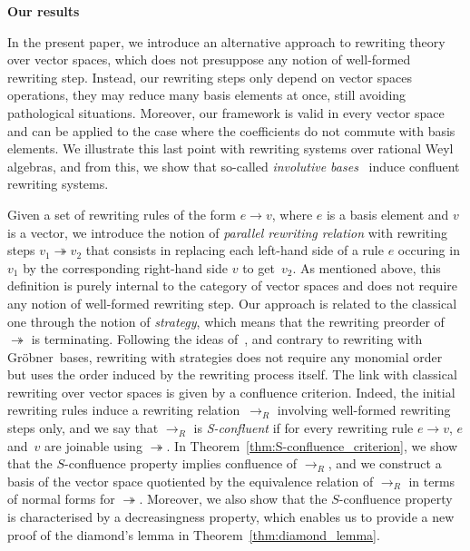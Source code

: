 \documentclass[11pt]{article}
\theoremstyle{definition}
\newcommand\G{Gröbner}
\newcommand\rewR{\to_R}
\newcommand\parRew{\twoheadrightarrow}
\begin{document}
\begin{center}
  \large\bf Our results
\end{center}

In the present paper, we introduce an alternative approach to rewriting
theory over vector spaces, which does not presuppose any notion of
well-formed rewriting step. Instead, our rewriting steps only depend on
vector spaces operations, they may reduce many basis elements at once,
still avoiding pathological situations. Moreover, our framework is valid
in every vector space and can be applied to the case where the
coefficients do not commute with basis elements. We illustrate this last
point with rewriting systems over rational Weyl algebras, and from this,
we show that so-called {\em involutive bases}~\cite{MR1627129} induce
confluent rewriting systems.
\medskip

Given a set of rewriting rules of the form $e\to v$, where $e$ is a basis
element and $v$ is a vector, we introduce the notion of
{\em parallel rewriting relation} with rewriting steps $v_1\parRew v_2$
that consists in replacing each left-hand side of a rule $e$ occuring in
$v_1$ by the corresponding right-hand side $v$ to get~$v_2$. As mentioned
above, this definition is purely internal to the category of vector
spaces and does not require any notion of well-formed rewriting step. Our
approach is related to the classical one through the notion of
{\em strategy}, which means that the rewriting preorder of $\parRew$ is
terminating. Following the ideas of~\cite{GuiraudHoffbeckMalbos19}, and
contrary to rewriting with \G\ bases, rewriting with strategies does not
require any monomial order but uses the order induced by the rewriting
process itself. The link with classical rewriting over vector spaces is
given by a confluence criterion. Indeed, the initial rewriting rules
induce a rewriting relation~$\rewR$ involving well-formed rewriting steps
only, and we say that $\rewR$ is {\em S-confluent} if for every rewriting
rule $e\to v$, $e$ and~$v$ are joinable using $\parRew$. In
Theorem~\ref{thm:S-confluence_criterion}, we show that the $S$-confluence
property implies confluence of $\rewR$, and we construct a basis of the
vector space quotiented by the equivalence relation of $\rewR$ in terms
of normal forms for $\parRew$. Moreover, we also show that the
$S$-confluence property is characterised by a decreasingness property,
which enables us to provide a new proof of the diamond's lemma in
Theorem~\ref{thm:diamond_lemma}.
\medskip
\end{document}
